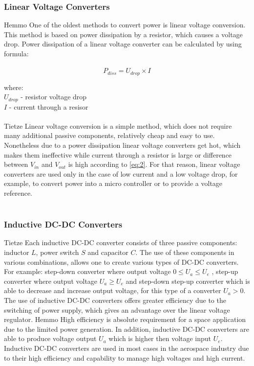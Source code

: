 \subsubsection{Linear Voltage Converters \label{sec:tech}}

Hemmo\cite{18} One of the oldest methods to convert power is linear voltage conversion. This method is based on power dissipation by a resistor, which causes a voltage drop. Power dissipation of a linear voltage converter can be calculated by using formula:\\ \\

\begin{equation}\label{eq:2}
P_{diss}=U_{drop} \times I
\end{equation}


where:\\
$U_{drop}$ - resistor voltage drop\\
$I$ - current through a resisor\\ \\
 Tietze \cite{18} Linear voltage conversion is a simple method, which does not require many additional passive components, relatively cheap and easy to use. Nonetheless due to a power dissipation linear voltage converters get hot, which makes them ineffective while current through a resistor is large or difference between $V_{in}$ and $V_{out}$ is high according to \eqref{eq:2}. For that reason, linear voltage converters are used only in the case of low current and a low voltage drop, for example, to convert power into a micro controller or to provide a voltage reference.\\
 \\
 
 
\subsubsection{Inductive DC-DC Converters \label{sec:tech}}

Tietze\cite{18} Each inductive DC-DC converter consists of three passive components: inductor $L$, power switch $S$ and capacitor $C$. The use of these components in various combinations, allows one to create various types of DC-DC converters. For example: step-down converter where output voltage $0 \leq U_{a} \leq U_{e} $ , step-up converter where output voltage $U_{a} \geq U_{e} $  and   step-down step-up converter which is able to decrease and increase output voltage, for this type of a converter $ U_{a} > 0$. The use of inductive DC-DC converters offers greater efficiency due to the switching of power supply, which gives an advantage over the linear voltage regulator. Hemmo\cite{17} High efficiency is absolute requirement for a space application due to the limited power generation. In addition, inductive DC-DC converters are able to produce  voltage output $U_{a}$ which is higher then voltage input $U_{e}$. Inductive DC-DC converters are used in most cases in the aerospace industry due to their high efficiency and capability to manage high voltages and high current.

